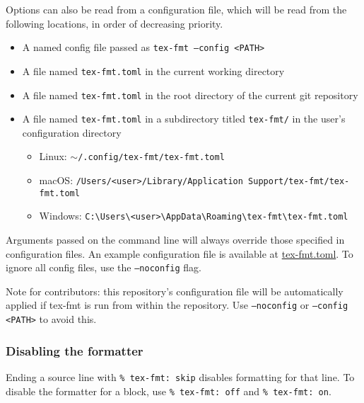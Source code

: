 \documentclass{scrartcl}
\begin{document}
Options can also be read from a configuration file, which
will be read from the following locations, in order of decreasing priority.

\begin{itemize}
\item{} A named config file passed as \texttt{tex-fmt --config \textless{}PATH\textgreater{}}
\item{} A file named \texttt{tex-fmt.toml} in the current working directory
\item{} A file named \texttt{tex-fmt.toml} in the root directory of the current git repository
\item{} A file named \texttt{tex-fmt.toml} in a subdirectory titled \texttt{tex-fmt/}
in the user's configuration directory


\begin{itemize}
\item{} Linux: \texttt{\ensuremath{\sim}/.config/tex-fmt/tex-fmt.toml}
\item{} macOS: \texttt{/Users/\textless{}user\textgreater{}/Library/Application Support/tex-fmt/tex-fmt.toml}
\item{} Windows: \texttt{C:\textbackslash{}Users\textbackslash{}\textless{}user\textgreater{}\textbackslash{}AppData\textbackslash{}Roaming\textbackslash{}tex-fmt\textbackslash{}tex-fmt.toml}
\end{itemize}
\end{itemize}

Arguments passed on the command line will always override those
specified in configuration files. An example configuration file
is available at
\href{https://github.com/WGUNDERWOOD/tex-fmt/blob/main/tex-fmt.toml}{tex-fmt.toml}.
To ignore all config files, use the \texttt{--noconfig} flag.

Note for contributors: this repository's configuration file will be
automatically applied if tex-fmt is run from within the repository.
Use \texttt{--noconfig} or \texttt{--config \textless{}PATH\textgreater{}} to avoid this.

\subsubsection{Disabling the formatter}\hypertarget{disabling-the-formatter}{}\label{disabling-the-formatter}

Ending a source line with \texttt{\% tex-fmt: skip} disables formatting for that line.
To disable the formatter for a block, use \texttt{\% tex-fmt: off} and \texttt{\% tex-fmt: on}.
\end{document}
